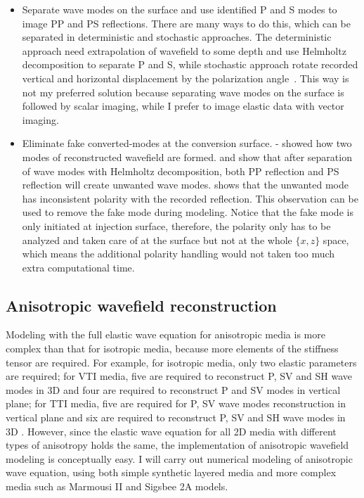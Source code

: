 \begin{itemize}
\item Separate wave modes on the surface and use identified P and S modes to image PP and PS reflections. There are many ways to do this, which can be separated in deterministic and stochastic approaches. The deterministic approach need extrapolation of wavefield to some depth and use Helmholtz decomposition to separate P and S, while stochastic approach rotate recorded vertical and horizontal displacement by the polarization angle~\cite[]{SEG-1989-1308}.
This way is not my preferred solution because separating wave modes on the surface
is followed by scalar imaging, while I prefer to image elastic data with vector imaging.


\item Eliminate fake converted-modes at the conversion surface. - showed how two modes of reconstructed wavefield are formed.  and  show that after separation of wave modes with Helmholtz decomposition, both PP reflection and PS reflection will create unwanted wave modes.  shows that the unwanted mode has inconsistent polarity with the recorded reflection. This observation can be used to remove the fake mode during modeling. Notice that the fake mode is only initiated at injection surface, therefore, the polarity only has to be analyzed and taken care of at the surface but not at the whole $\{x,z\}$ space, which means the additional polarity handling would not taken too much extra computational time.


\end{itemize}




\subsection{Anisotropic wavefield reconstruction}
Modeling with the full elastic wave equation for anisotropic media is more complex than that for isotropic media, because more elements of the stiffness tensor are required. For example, for isotropic media, only two elastic parameters are required; for VTI media, five are required to reconstruct P, SV and SH wave modes in 3D and four are required to reconstruct P and SV modes in vertical plane; for TTI media, five are required for P, SV wave modes reconstruction in vertical plane and six are required to reconstruct P, SV and SH wave modes in 3D . However, since the elastic wave equation for all 2D media with different types of anisotropy holds the same, the implementation of anisotropic wavefield modeling is conceptually easy. I will carry out numerical modeling of anisotropic wave equation, using both simple synthetic layered media and more complex media such as Marmousi II and Sigsbee 2A models.

